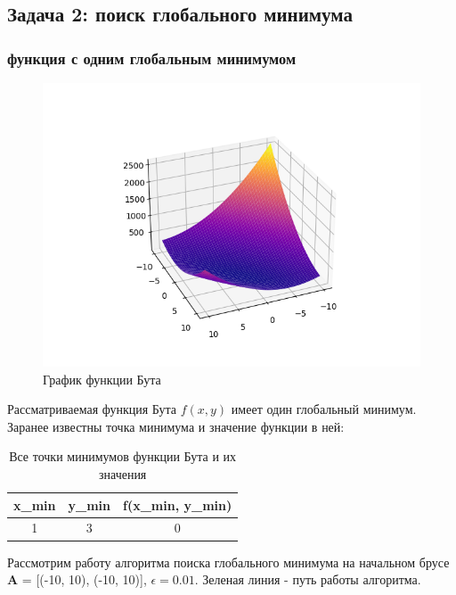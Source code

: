 \subsection{Задача 2: поиск глобального минимума}

\subsubsection{функция с одним глобальным минимумом}

\begin{figure}[H]
		\centering
			\includegraphics{task2/resources/Figure_1.png}
		\caption{График функции Бута}
		\label{w_pert}
	\end{figure}

Рассматриваемая функция Бута $f(x, y)$ имеет один глобальный минимум. Заранее известны точка минимума и значение функции в ней:

\begin{table}[H]
	\centering
	\begin{tabular}{| c | c | c |}
		\hline
		    x_{min} & y_{min} & f(x_{min}, y_{min}) \\
		\hline
		    1 & 3 & 0 \\
   		\hline
	\end{tabular}
	\caption{Все точки минимумов функции Бута и их значения}
\end{table}

Рассмотрим работу алгоритма поиска глобального минимума на начальном брусе \textbf{A} = [(-10, 10), (-10, 10)], $\epsilon = 0.01$. Зеленая линия - путь работы алгоритма.

